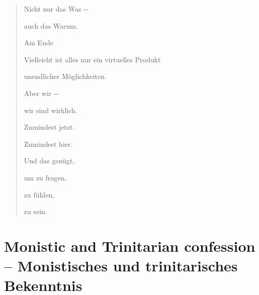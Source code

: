 \documentclass[
  ngerman,
]{article}
\begin{document}
\begin{quote}
Nicht nur das Was -\/-

auch das Warum.

Am Ende

Vielleicht ist alles nur ein virtuelles Produkt

unendlicher Möglichkeiten.

Aber wir -\/-

wir sind wirklich.

Zumindest jetzt.

Zumindest hier.

Und das genügt,

um zu fragen,

zu fühlen,

zu sein.
\end{quote}

\section{\texorpdfstring{\textbf{Monistic and Trinitarian confession --
Monistisches und trinitarisches
Bekenntnis}}{Monistic and Trinitarian confession -- Monistisches und trinitarisches Bekenntnis}}\label{monistic-and-trinitarian-confession-monistisches-und-trinitarisches-bekenntnis}
\end{document}
